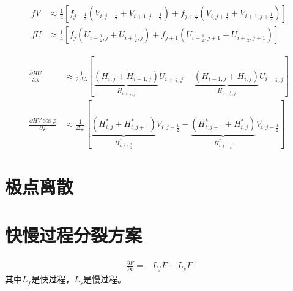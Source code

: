 \documentclass{ctexart}
\begin{document}
\begin{align}
  f V & \approx \frac{1}{4} \left[ f_{j-\frac{1}{2}} \left( V_{i,j-\frac{1}{2}} + V_{i+1,j-\frac{1}{2}} \right) + f_{j+\frac{1}{2}} \left( V_{i,j+\frac{1}{2}} + V_{i+1,j+\frac{1}{2}} \right) \right] \\
  f U & \approx \frac{1}{4} \left[ f_{j} \left( U_{i-\frac{1}{2},j} + U_{i+\frac{1}{2},j} \right) + f_{j+1} \left( U_{i-\frac{1}{2},j+1} + U_{i+\frac{1}{2},j+1} \right) \right]
\end{align}

\begin{align}
  \frac{\partial H U}{\partial \lambda} & \approx \frac{1}{2 \Delta{\lambda}} \left[ \underbrace{\left( H_{i,j} + H_{i+1,j} \right)}_{H_{i+\frac{1}{2},j}} U_{i+\frac{1}{2},j} - \underbrace{\left( H_{i-1,j} + H_{i,j} \right)}_{H_{i-\frac{1}{2},j}} U_{i-\frac{1}{2},j} \right] \\
  \frac{\partial H V \cos{\varphi}}{\partial \varphi} & \approx \frac{1}{\Delta{\varphi}} \left[ \underbrace{\left( H_{i,j}^* + H_{i,j+1}^* \right)}_{H_{i,j+\frac{1}{2}}^*} V_{i,j+\frac{1}{2}} - \underbrace{\left( H_{i,j-1}^* + H_{i,j}^* \right)}_{H_{i,j-\frac{1}{2}}^*} V_{i,j-\frac{1}{2}} \right]
\end{align}

\section{极点离散}

\section{快慢过程分裂方案}

\begin{align}
  \frac{\partial F}{\partial t} = - L_f F - L_s F
\end{align}
其中$L_f$是快过程，$L_s$是慢过程。
\end{document}
